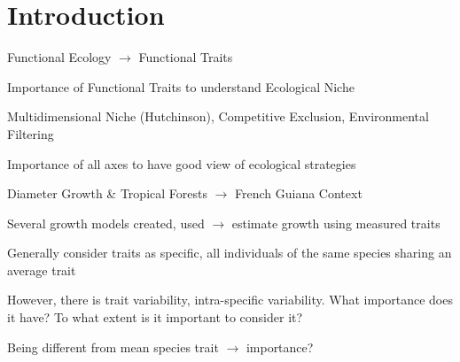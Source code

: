 \label{sec:Intro}
\section*{Introduction}

Functional Ecology $\rightarrow$ Functional Traits

Importance of Functional Traits to understand Ecological Niche

Multidimensional Niche (Hutchinson), Competitive Exclusion, Environmental Filtering

Importance of all axes to have good view of ecological strategies

Diameter Growth \& Tropical Forests $\rightarrow$ French Guiana Context

Several growth models created, used $\rightarrow$ estimate growth using measured traits

Generally consider traits as specific, all individuals of the same species sharing an average trait

However, there is trait variability, intra-specific variability. What importance does it have? To what extent is it important to consider it? 

Being different from mean species trait $\rightarrow$ importance?